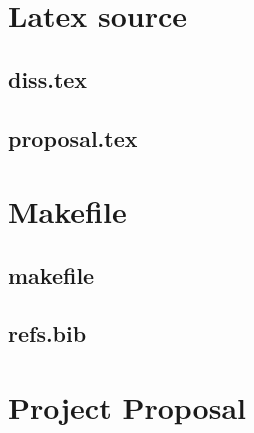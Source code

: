 \documentclass[12pt,a4paper,twoside,openright]{report}
\begin{document}
\printbibliography

\appendix

\chapter{Latex source}

\section{diss.tex}
{\scriptsize}

\section{proposal.tex}
{\scriptsize}

\chapter{Makefile}

\section{makefile}\label{makefile}
{\scriptsize}

\section{refs.bib}
{\scriptsize}


\chapter{Project Proposal}


\end{document}
